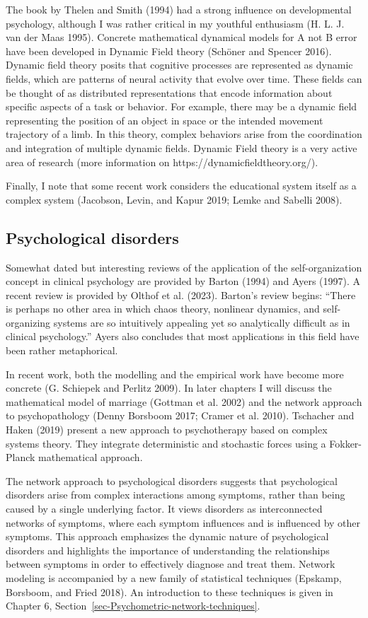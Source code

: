 \documentclass[
  a4paper,
  DIV=11,
  numbers=noendperiod]{scrreprt}
\begin{document}
The book by Thelen and Smith (1994) had a strong influence on
developmental psychology, although I was rather critical in my youthful
enthusiasm (H. L. J. van der Maas 1995). Concrete mathematical dynamical
models for A not B error have been developed in Dynamic Field theory
(Schöner and Spencer 2016). Dynamic field theory posits that cognitive
processes are represented as dynamic fields, which are patterns of
neural activity that evolve over time. These fields can be thought of as
distributed representations that encode information about specific
aspects of a task or behavior. For example, there may be a dynamic field
representing the position of an object in space or the intended movement
trajectory of a limb. In this theory, complex behaviors arise from the
coordination and integration of multiple dynamic fields. Dynamic Field
theory is a very active area of research (more information on
https://dynamicfieldtheory.org/).

Finally, I note that some recent work considers the educational system
itself as a complex system (Jacobson, Levin, and Kapur 2019; Lemke and
Sabelli 2008).

\hypertarget{sec-Psychological-disorders}{%
\subsection{Psychological disorders}\label{sec-Psychological-disorders}}

Somewhat dated but interesting reviews of the application of the
self-organization concept in clinical psychology are provided by Barton
(1994) and Ayers (1997). A recent review is provided by Olthof et al.
(2023). Barton's review begins: ``There is perhaps no other area in
which chaos theory, nonlinear dynamics, and self-organizing systems are
so intuitively appealing yet so analytically difficult as in clinical
psychology.'' Ayers also concludes that most applications in this field
have been rather metaphorical.

In recent work, both the modelling and the empirical work have become
more concrete (G. Schiepek and Perlitz 2009). In later chapters I will
discuss the mathematical model of marriage (Gottman et al. 2002) and the
network approach to psychopathology (Denny Borsboom 2017; Cramer et al.
2010). Tschacher and Haken (2019) present a new approach to
psychotherapy based on complex systems theory. They integrate
deterministic and stochastic forces using a Fokker-Planck mathematical
approach.

The network approach to psychological disorders suggests that
psychological disorders arise from complex interactions among symptoms,
rather than being caused by a single underlying factor. It views
disorders as interconnected networks of symptoms, where each symptom
influences and is influenced by other symptoms. This approach emphasizes
the dynamic nature of psychological disorders and highlights the
importance of understanding the relationships between symptoms in order
to effectively diagnose and treat them. Network modeling is accompanied
by a new family of statistical techniques (Epskamp, Borsboom, and Fried
2018). An introduction to these techniques is given in Chapter 6,
Section~\ref{sec-Psychometric-network-techniques}.
\end{document}
